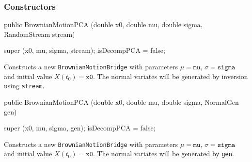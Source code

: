 \subsubsection* {Constructors}
\begin{code}

   public BrownianMotionPCA (double x0, double mu, double sigma,
                             RandomStream stream) \begin{hide} {
        super (x0, mu, sigma, stream);
        isDecompPCA = false;
    }\end{hide}
\end{code}
\begin{tabb} Constructs a new \texttt{BrownianMotionBridge} with
parameters $\mu = \texttt{mu}$, $\sigma = \texttt{sigma}$ and initial value
$X(t_{0}) = \texttt{x0}$.
The normal variates will be generated by inversion using \texttt{stream}.
\end{tabb}
\begin{code}

   public BrownianMotionPCA (double x0, double mu, double sigma,
                             NormalGen gen) \begin{hide} {
        super (x0, mu, sigma, gen);
        isDecompPCA = false;
    }\end{hide}
\end{code}
\begin{tabb} Constructs a new \texttt{BrownianMotionBridge} with
parameters $\mu = \texttt{mu}$, $\sigma = \texttt{sigma}$ and initial value
$X(t_{0}) = \texttt{x0}$.
The normal variates will be generated by \texttt{gen}.
\end{tabb}

